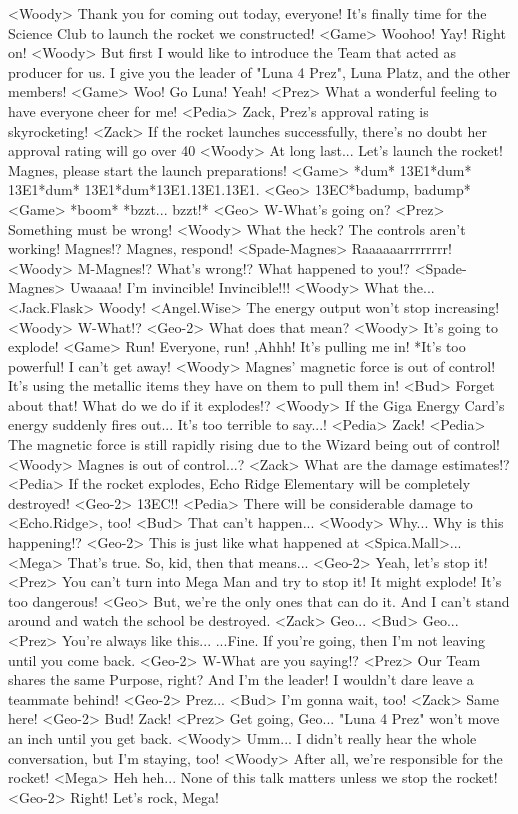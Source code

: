 <Woody> Thank you for coming out today, everyone! 
It's finally time for the Science Club to launch the rocket we constructed! 
<Game> Woohoo! Yay! Right on! 
<Woody> But first I would like to introduce the Team that acted as producer for us. 
I give you the leader of "Luna 4 Prez", Luna Platz, and the other members! 
<Game> Woo! Go Luna! Yeah! 
<Prez> What a wonderful feeling to have everyone cheer for me! 
<Pedia> Zack, Prez's approval rating is skyrocketing! 
<Zack> If the rocket launches successfully, there's no 
doubt her approval rating will go over 40%
<Woody> At long last... Let's launch the rocket! 
Magnes, please start the launch preparations! 
<Game> *dum* {13}{E1}*dum* {13}{E1}*dum* {13}{E1}*dum*{13}{E1}.{13}{E1}.{13}{E1}. 
<Geo> {13}{EC}*badump, badump* 
<Game> *boom* *bzzt... bzzt!* 
<Geo> W-What's going on? 
<Prez> Something must be wrong! 
<Woody> What the heck? The controls aren't working! 
Magnes!? Magnes, respond! 
<Spade-Magnes> Raaaaaarrrrrrrr! 
<Woody> M-Magnes!? What's wrong!? What happened to you!? 
<Spade-Magnes> Uwaaaa! I'm invincible! Invincible!!! 
<Woody> What the... 
<Jack.Flask> Woody! 
<Angel.Wise> The energy output won't stop increasing! 
<Woody> W-What!? 
<Geo-2> What does that mean? 
<Woody> It's going to explode! 
<Game> Run! 
Everyone, run! 
,Ahhh! It's pulling me in! 
*It's too powerful! I can't get away! 
<Woody> Magnes' magnetic force is out of control! 
It's using the metallic items they have on them to pull them in! 
<Bud> Forget about that! What do we do if it explodes!? 
<Woody> If the Giga Energy Card's energy suddenly fires out... It's too terrible to say...! 
<Pedia> Zack! 
<Pedia> The magnetic force is still rapidly rising due to the Wizard being out of control! 
<Woody> Magnes is out of control...? 
<Zack> What are the damage estimates!? 
<Pedia> If the rocket explodes, Echo Ridge Elementary will be completely destroyed! 
<Geo-2> {13}{EC}!! 
<Pedia> There will be considerable damage to <Echo.Ridge>, too! 
<Bud> That can't happen... 
<Woody> Why... 
Why is this happening!? 
<Geo-2> This is just like what happened at <Spica.Mall>... 
<Mega> That's true. So, kid, then that means... 
<Geo-2> Yeah, let's stop it! 
<Prez> You can't turn into Mega Man and try to stop it! 
It might explode! It's too dangerous! 
<Geo> But, we're the only ones that can do it. 
And I can't stand around and watch the school be destroyed. 
<Zack> Geo... 
<Bud> Geo... 
<Prez> You're always like this... 
...Fine. 
If you're going, then I'm not leaving until you come back. 
<Geo-2> W-What are you saying!? 
<Prez> Our Team shares the same Purpose, right? And I'm the leader! 
I wouldn't dare leave a teammate behind! 
<Geo-2> Prez... 
<Bud> I'm gonna wait, too! 
<Zack> Same here! 
<Geo-2> Bud! Zack! 
<Prez> Get going, Geo... 
"Luna 4 Prez" won't move an inch until you get back. 
<Woody> Umm... 
I didn't really hear the whole conversation, but I'm staying, too! 
<Woody> After all, we're responsible for the rocket! 
<Mega> Heh heh... None of this talk matters unless we stop the rocket! 
<Geo-2> Right! Let's rock, Mega! 
